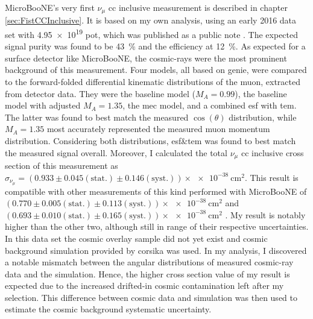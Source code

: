 MicroBooNE's very first $\nu_\mu$ \gls{cc} inclusive measurement is described in chapter \ref{sec:FistCCInclusive}. It is based on my own analysis, using an early 2016 data set with \num{4.95e19} \gls{pot}, which was published as a public note \cite{MicroBooNECCInclPN}. The expected signal purity was found to be \SI{43}{\percent} and the efficiency at \SI{12}{\percent}. As expected for a surface detector like MicroBooNE, the cosmic-rays were the most prominent background of this measurement. Four models, all based on \gls{genie}, were compared to the forward-folded differential kinematic distributions of the muon, extracted from detector data. They were the baseline model ($M_A = \num{0.99}$), the baseline model with adjusted $M_A = \num{1.35}$, the \gls{mec} model, and a combined \gls{esf} with \gls{tem}. The latter was found to best match the measured $\cos{(\theta)}$ distribution, while $M_A = \num{1.35}$ most accurately represented the measured muon momentum distribution. Considering both distributions, \gls{esf}\&\gls{tem} was found to best match the measured signal overall. Moreover, I calculated the total $\nu_\mu$ \gls{cc} inclusive cross section of this measurement as $\sigma_{\nu_{\mu}} = ( \num{0.933} \pm 0.045 (\text{stat.}) \pm 0.146 (\text{syst.}) ) \times \SI{e-38}{\centi\metre\squared}$. This result is compatible with other measurements of this kind performed with MicroBooNE of $( \num{0.770} \pm 0.005 (\text{stat.}) \pm 0.113 (\text{syst.}) ) \times \SI{e-38}{\centi\metre\squared}$ \cite{CRTThomasPhD} and $( \num{0.693} \pm 0.010 (\text{stat.}) \pm 0.165 (\text{syst.}) ) \times \SI{e-38}{\centi\metre\squared}$ \cite{MicroBooNEFirstCCInclPublished}. My result is notably higher than the other two, although still in range of their respective uncertainties. In this data set the cosmic overlay sample did not yet exist and cosmic background simulation provided by \gls{corsika} was used. In my analysis, I discovered a notable mismatch between the angular distributions of measured cosmic-ray data and the simulation. Hence, the higher cross section value of my result is expected due to the increased drifted-in cosmic contamination left after my selection. This difference between cosmic data and simulation was then used to estimate the cosmic background systematic uncertainty.

